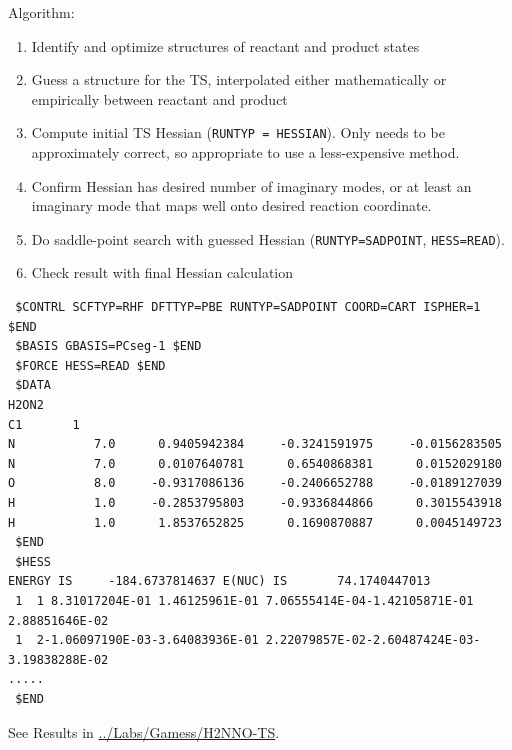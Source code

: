 \documentclass[11pt]{article}
\begin{document}
Algorithm:
\begin{enumerate}
\item Identify and optimize structures of reactant and product states
\item Guess a structure for the TS, interpolated either mathematically or empirically between reactant and product
\item Compute initial TS Hessian (\texttt{RUNTYP = HESSIAN}).  Only needs to be approximately correct, so appropriate to use a less-expensive method.
\item Confirm Hessian has desired number of imaginary modes, or at least an imaginary mode that maps well onto desired reaction coordinate.
\item Do saddle-point search with guessed Hessian (\texttt{RUNTYP=SADPOINT}, \texttt{HESS=READ}).
\item Check result with final Hessian calculation
\end{enumerate}

\begin{verbatim}
 $CONTRL SCFTYP=RHF DFTTYP=PBE RUNTYP=SADPOINT COORD=CART ISPHER=1 $END
 $BASIS GBASIS=PCseg-1 $END
 $FORCE HESS=READ $END
 $DATA  
H2ON2                                                                           
C1       1
N           7.0      0.9405942384     -0.3241591975     -0.0156283505
N           7.0      0.0107640781      0.6540868381      0.0152029180
O           8.0     -0.9317086136     -0.2406652788     -0.0189127039
H           1.0     -0.2853795803     -0.9336844866      0.3015543918
H           1.0      1.8537652825      0.1690870887      0.0045149723
 $END      
 $HESS
ENERGY IS     -184.6737814637 E(NUC) IS       74.1740447013
 1  1 8.31017204E-01 1.46125961E-01 7.06555414E-04-1.42105871E-01 2.88851646E-02
 1  2-1.06097190E-03-3.64083936E-01 2.22079857E-02-2.60487424E-03-3.19838288E-02
.....
 $END
\end{verbatim}

See Results in \url{../Labs/Gamess/H2NNO-TS}.
\end{document}
